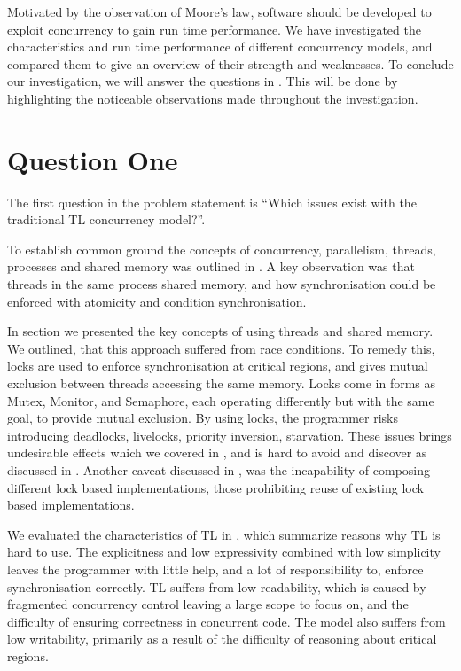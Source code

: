\makeatletter {}\makeatother
{}
%
Motivated by the observation of Moore's law, software should be developed to exploit concurrency to gain run time performance. We have investigated the characteristics and run time performance of different concurrency models, and compared them to give an overview of their strength and weaknesses. To conclude our investigation, we will answer the questions in . This will be done by highlighting the noticeable observations made throughout the investigation.
\label{chap:conclusion}
\section{Question One}
The first question in the problem statement is ``Which issues exist with the traditional \ac{TL} concurrency model?''. 

To establish common ground the concepts of concurrency, parallelism, threads, processes and shared memory was outlined in . A key observation was that threads in the same process shared memory, and how synchronisation could be enforced with atomicity and condition synchronisation.

In section  we presented the key concepts of using threads and shared memory. We outlined, that this approach suffered from race conditions. To remedy this, locks are used to enforce synchronisation at critical regions, and gives mutual exclusion between threads accessing the same memory. Locks come in forms as Mutex, Monitor, and Semaphore, each operating differently but with the same goal, to provide mutual exclusion. By using locks, the programmer risks introducing deadlocks, livelocks, priority inversion, starvation. These issues brings undesirable effects which we covered in , and is hard to avoid and discover as discussed in . Another caveat discussed in , was the incapability of composing different lock based implementations, those prohibiting reuse of existing lock based implementations. 

We evaluated the characteristics of \ac{TL} in , which summarize reasons why \ac{TL} is hard to use. The explicitness and low expressivity combined with low simplicity leaves the programmer with little help, and a lot of responsibility to, enforce synchronisation correctly. \ac{TL} suffers from low readability, which is caused by fragmented concurrency control leaving a large scope to focus on, and the difficulty of ensuring correctness in concurrent code. The model also suffers from low writability, primarily as a result of the difficulty of reasoning about critical regions.

